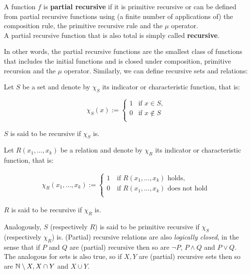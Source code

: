 \documentclass[../main.tex]{memoir}
\begin{document}
\begin{definition}
  A function $f$ is \textbf{partial recursive} if it is primitive recursive or can be defined from partial recursive functions using (a finite number of applications of) the composition rule, the primitive recursive rule and the $\mu$ operator. \\
  A partial recursive function that is also total is simply called \textbf{recursive}.
\end{definition}

In other words, the partial recursive functions are the smallest class of functions that includes the initial functions and is closed under composition, primitive recursion and the $\mu$ operator. Similarly, we can define recursive sets and relations:

\begin{definition}
  Let $S$ be a set and denote by $\chi_S$ its indicator or characteristic function, that is:

  \begin{equation*}
    \chi_S(x) := \left\{
    \begin{array}{lr}
      1 & \text{if } x \in S \text{,} \\
      0 & \text{if } x \not\in S \\
    \end{array}\right.
  \end{equation*}

  $S$ is said to be recursive if $\chi_S$ is.
\end{definition}

\begin{definition}
  Let $R(x_1, \ldots, x_k)$ be a relation and denote by $\chi_R$ its indicator or characteristic function, that is:

  \begin{align*}
    \chi_R(x_1, \ldots, x_k) := \left\{
    \begin{array}{lr}
      1 \quad \text{if } R(x_1, \ldots, x_k) \text{ holds,} \\
      0 \quad \text{if } R(x_1, \ldots, x_k) \text{ does not hold} \\
    \end{array}\right.
  \end{align*}

  $R$ is said to be recursive if $\chi_R$ is.
\end{definition}

Analogously, $S$ (respectively $R$) is said to be primitive recursive if $\chi_S$ (respectively $\chi_R$) is. (Partial) recursive relations are also \textit{logically closed}, in the sense that if $P$ and $Q$ are (partial) recursive then so are $\neg P$, $P \land Q$ and $P \lor Q$. The analogous for sets is also true, so if $X, Y$ are (partial) recursive sets then so are $\mathbb{N} \setminus X, X \cap Y$ and $X \cup Y$.
\end{document}
